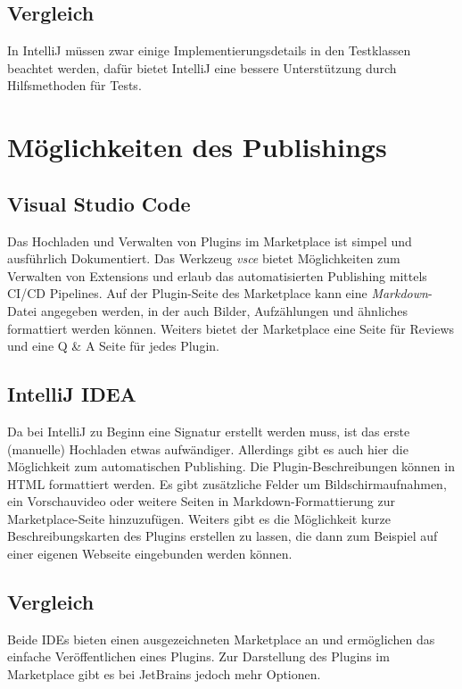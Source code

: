 \subsection{Vergleich}

In IntelliJ müssen zwar einige Implementierungsdetails in den Testklassen
beachtet werden, dafür bietet IntelliJ eine bessere Unterstützung
durch Hilfsmethoden für Tests.


\section{Möglichkeiten des Publishings}
\label{sec:Vergleich_Publishing}

\subsection{Visual Studio Code}

Das Hochladen und Verwalten von Plugins im Marketplace ist
simpel und ausführlich Dokumentiert. Das Werkzeug \emph{vsce}
bietet Möglichkeiten zum Verwalten von Extensions und 
erlaub das automatisierten Publishing mittels CI/CD Pipelines.
Auf der Plugin-Seite des Marketplace kann eine \emph{Markdown}-Datei
angegeben werden, in der auch Bilder, Aufzählungen und ähnliches formattiert
werden können. Weiters bietet der Marketplace eine Seite für Reviews
und eine Q \& A Seite für jedes Plugin.

\subsection{IntelliJ IDEA}

Da bei IntelliJ zu Beginn eine Signatur erstellt werden muss, ist das
erste (manuelle) Hochladen etwas aufwändiger. Allerdings
gibt es auch hier die Möglichkeit zum automatischen Publishing.
Die Plugin-Beschreibungen können in HTML formattiert werden. Es gibt
zusätzliche Felder um Bildschirmaufnahmen, ein Vorschauvideo oder
weitere Seiten in Markdown-Formattierung zur Marketplace-Seite
hinzuzufügen. Weiters gibt es die Möglichkeit kurze Beschreibungskarten
des Plugins erstellen zu lassen, die dann zum Beispiel auf 
einer eigenen Webseite eingebunden werden können.

\subsection{Vergleich}

Beide IDEs bieten einen ausgezeichneten Marketplace an
und ermöglichen das einfache Veröffentlichen eines Plugins.
Zur Darstellung des Plugins im Marketplace gibt es bei JetBrains
jedoch mehr Optionen.


